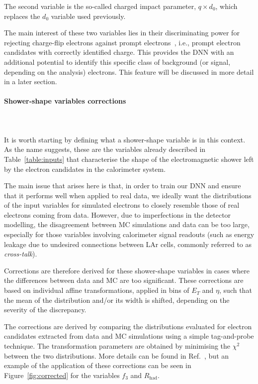 The second variable is the so-called charged impact parameter, $q \times d_{0}$, which replaces the $d_{0}$ variable used previously.

The main interest of these two variables lies in their discriminating power for rejecting charge-flip electrons against prompt electrons~\cite{carnelli}, i.e., prompt electron candidates with correctly identified charge. This provides the DNN with an additional potential to identify this specific class of background (or signal, depending on the analysis) electrons. This feature will be discussed in more detail in a later section.

\paragraph{Shower-shape variables corrections} \mbox{}\\
\\
It is worth starting by defining what a shower-shape variable is in this context. As the name suggests, these are the variables already described in Table~\ref{table:inputs} that characterise the shape of the electromagnetic shower left by the electron candidates in the calorimeter system.

The main issue that arises here is that, in order to train our DNN and ensure that it performs well when applied to real data, we ideally want the distributions of the input variables for simulated electrons to closely resemble those of real electrons coming from data. However, due to imperfections in the detector modelling, the disagreement between MC simulations and data can be too large, especially for those variables involving calorimeter signal readouts (such as energy leakage due to undesired connections between LAr cells, commonly referred to as \textit{cross-talk}).

Corrections are therefore derived for these shower-shape variables in cases where the differences between data and MC are too significant. These corrections are based on individual affine transformations, applied in bins of $E_{T}$ and $\eta$, such that the mean of the distribution and/or its width is shifted, depending on the severity of the discrepancy.

The corrections are derived by comparing the distributions evaluated for \Zee electron candidates extracted from data and MC simulations using a simple tag-and-probe technique. The transformation parameters are obtained by minimising the $\chi^2$ between the two distributions. More details can be found in Ref.~\cite{Aaboud:2657964}, but an example of the application of these corrections can be seen in Figure~\ref{fig:corrected} for the variables $f_{3}$ and $R_{\text{had}}$.


